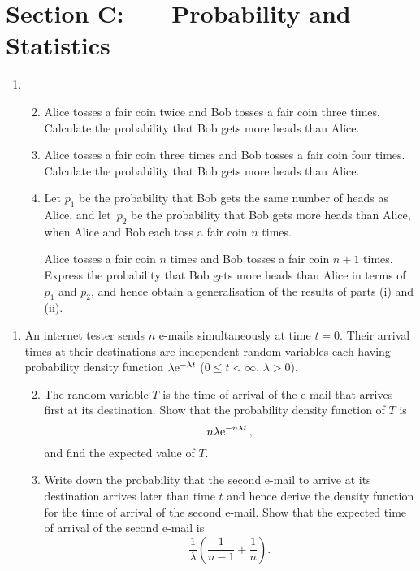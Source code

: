 \documentclass[a4, 11pt]{report}
\newlength{\qspace}
\newcounter{qnumber}
\newenvironment{question}%
 {\vspace{\qspace}
  \begin{enumerate}[\bfseries 1\quad][10]%
    \setcounter{enumi}{\value{qnumber}}%
    \item%
 }
{
  \end{enumerate}
  \filbreak
  \stepcounter{qnumber}
 }
\newenvironment{questionparts}[1][1]%
 {
  \begin{enumerate}[\bfseries (i)]%
    \setcounter{enumii}{#1}
    \addtocounter{enumii}{-1}
    \setlength{\itemsep}{5mm}
    \setlength{\parskip}{8pt}
 }
 {
  \end{enumerate}
 }
\def\e{{\rm e}}
\def\le{\leqslant}
\begin{document}
\section*{Section C: \ \ \ Probability and Statistics}
\begin{question}
\begin{questionparts}
\item Alice tosses a fair coin twice and Bob tosses a fair coin three times.
Calculate the probability that Bob gets more heads than Alice.
\item Alice tosses a fair coin three times
 and Bob tosses a fair coin four times.
Calculate the probability that Bob gets more heads than Alice.

\item 
Let $p_1$ be the probability that Bob gets the same number of heads as
Alice, and let~$p_2$ be the probability that Bob gets more
heads than Alice,  when 
 Alice and Bob each toss a fair coin $n$ times.

Alice tosses a fair coin $n$ times and Bob tosses a fair coin $n+1$ times.
Express the probability that Bob gets more heads than Alice
in terms of $p_1$ and $p_2$, and hence obtain a generalisation of the 
results of parts (i) and (ii).

\end{questionparts}

\end{question}



\begin{question}
 An internet tester  sends $n$ e-mails simultaneously at 
time $t=0$. Their
arrival times at their destinations 
are independent random variables each having probability density function
$\lambda \e^{-\lambda t}$ ($0\le t<\infty$, $ \lambda >0$).

\begin{questionparts}
\item 
The random variable $T$ is 
the time of arrival of the e-mail that arrives first at its destination.
Show that the probability density function of 
$T$ is
\[
n  \lambda  \e^{-n\lambda t}
\,,
\]
and find the expected value of $T$.

\item
 Write down the probability
that the second e-mail to arrive at its destination arrives later than  time $t$
and hence derive the density function for the time of arrival of the second
e-mail. Show that the expected time of arrival of the second e-mail is
  \[
\frac{1}{\lambda} \left( \frac1{n-1} + \frac 1 n \right)
.
\] 
\end{questionparts}

\end{question}
\end{document}
